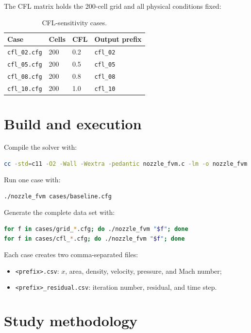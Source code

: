 \documentclass[11pt,a4paper]{article}
\begin{document}
The CFL matrix holds the 200-cell grid and all physical conditions fixed:
\begin{table}[h]
\centering
\caption{CFL-sensitivity cases.}
\begin{tabular}{llll}
\toprule
Case & Cells & CFL & Output prefix \\
\midrule
\texttt{cfl\_02.cfg} & 200 & 0.2 & \texttt{cfl\_02} \\
\texttt{cfl\_05.cfg} & 200 & 0.5 & \texttt{cfl\_05} \\
\texttt{cfl\_08.cfg} & 200 & 0.8 & \texttt{cfl\_08} \\
\texttt{cfl\_10.cfg} & 200 & 1.0 & \texttt{cfl\_10} \\
\bottomrule
\end{tabular}
\end{table}

\section{Build and execution}
Compile the solver with:
\begin{lstlisting}[language=bash]
cc -std=c11 -O2 -Wall -Wextra -pedantic nozzle_fvm.c -lm -o nozzle_fvm
\end{lstlisting}

Run one case with:
\begin{lstlisting}[language=bash]
./nozzle_fvm cases/baseline.cfg
\end{lstlisting}

Generate the complete data set with:
\begin{lstlisting}[language=bash]
for f in cases/grid_*.cfg; do ./nozzle_fvm "$f"; done
for f in cases/cfl_*.cfg; do ./nozzle_fvm "$f"; done
\end{lstlisting}

Each case creates two comma-separated files:
\begin{itemize}
  \item \texttt{<prefix>.csv}: $x$, area, density, velocity, pressure, and Mach number;
  \item \texttt{<prefix>\_residual.csv}: iteration number, residual, and time step.
\end{itemize}

\section{Study methodology}
\end{document}
